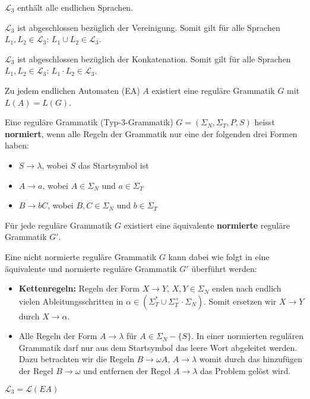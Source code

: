 \begin{lemma}
$\mathcal{L}_3$ enthält alle endlichen Sprachen.\\
\end{lemma}

\begin{lemma}
$\mathcal{L}_3$ ist abgeschlossen bezüglich der Vereinigung. Somit gilt für alle Sprachen $L_1, L_2 \in \mathcal{L}_3: \, L_1 \cup L_2 \in \mathcal{L}_3$.\\
\end{lemma}

\begin{lemma}
$\mathcal{L}_3$ ist abgeschlossen bezüglich der Konkatenation. Somit gilt für alle Sprachen $L_1, L_2 \in \mathcal{L}_3: \, L_1 \cdot L_2 \in \mathcal{L}_3$.\\
\end{lemma}

\begin{satz}
Zu jedem endlichen Automaten (EA) $A$ existiert eine reguläre Grammatik $G$ mit $L(A) = L(G)$.
\end{satz}

\begin{definition}
Eine reguläre Grammatik (Typ-3-Grammatik) $G = (\Sigma_N, \Sigma_T, P, S)$ heisst \textbf{normiert}, wenn alle Regeln der Grammatik nur eine der folgenden drei Formen haben:
\begin{itemize}
  \item $S \to \lambda$, wobei $S$ das Startsymbol ist
  \item $A \to a$, wobei $A \in \Sigma_N$ und $a \in \Sigma_T$
  \item $B \to bC$, wobei $B, C \in \Sigma_N$ und $b \in \Sigma_T$\\
\end{itemize}
\end{definition}

\begin{lemma}
Für jede reguläre Grammatik $G$ existiert eine äquivalente \textbf{normierte} reguläre Grammatik $G'$.\\
\end{lemma}

Eine nicht normierte reguläre Grammatik $G$ kann dabei wie folgt in eine äquivalente und normierte reguläre Grammatik $G'$ überführt werden:
\begin{itemize}
  \item \textbf{Kettenregeln:} Regeln der Form $X \to Y, \, X, Y \in \Sigma_N$ enden nach endlich vielen Ableitungsschritten in $\alpha \in (\Sigma_T^* \cup \Sigma_T^+ \cdot \Sigma_N)$. Somit ersetzen wir $X \to Y$ durch $X \to \alpha$.
  \item Alle Regeln der Form $A \to \lambda$ für $A \in \Sigma_N - \{S\}$. In einer normierten regulären Grammatik darf nur aus dem Startsymbol das leere Wort abgeleitet werden. Dazu betrachten wir die Regeln $B \to \omega A, \, A \to \lambda$ womit durch das hinzufügen der Regel $B \to \omega$ und entfernen der Regel $A \to \lambda$ das Problem gelöst wird.\\
\end{itemize}

\begin{satz}
$\mathcal{L}_3 = \mathcal{L}(EA)$
\end{satz}


